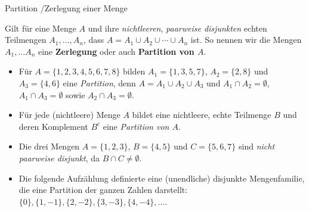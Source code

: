 \documentclass[12pt,ngerman,a4paper,ignorenonframetext,]{beamer}
\providecommand{\tightlist}{%
  \setlength{\itemsep}{0pt}\setlength{\parskip}{0pt}}
\begin{document}
\begin{frame}{Partition /\thinspace{}Zerlegung einer Menge}
\protect\hypertarget{partition-zerlegung-einer-menge}{}


\begin{definition}

Gilt für eine Menge \(A\) und ihre \emph{nichtleeren}, \emph{paarweise
disjunkten} echten Teilmengen \(A_1, \dots, A_n\), dass
\(A = A_1 \cup A_2 \cup \cdots \cup A_n\) ist. So nennen wir die Mengen
\(A_1, \dots A_n\) eine \textbf{Zerlegung} oder auch \textbf{Partition
von \(A\)}.

\end{definition}


\begin{Beispiele}[]

\begin{itemize}
\tightlist
\item
  Für \(A= \{1,2,3,4,5,6,7,8\}\) bilden \(A_1=\{1,3,5,7\}\),
  \(A_2=\{2,8\}\) und \(A_3=\{4,6\}\) eine \emph{Partition}, denn
  \(A=A_1\cup A_2 \cup A_3\) und \(A_1 \cap A_2=\emptyset\),
  \(A_1 \cap A_3=\emptyset\) sowie \(A_2 \cap A_3=\emptyset\).
\item
  Für jede (nichtleere) Menge \(A\) bildet eine nichtleere, echte
  Teilmenge \(B\) und deren Komplement \(B^c\) eine \emph{Partition von
  \(A\)}.
\item
  Die drei Mengen \(A = \{1, 2, 3\}\), \(B = \{4, 5\}\) und
  \(C = \{5, 6, 7\}\) sind \emph{nicht paarweise disjunkt}, da
  \(B \cap C \neq \emptyset\).
\item
  Die folgende Aufzählung definierte eine (unendliche) disjunkte
  Mengenfamilie, die eine Partition der ganzen Zahlen darstellt:
  \(\{0\}, \{1, -1\}, \{2, -2\}, \{3, -3\}, \{4, -4\}, \ldots\).
\end{itemize}

\end{Beispiele}

\end{frame}
\end{document}
